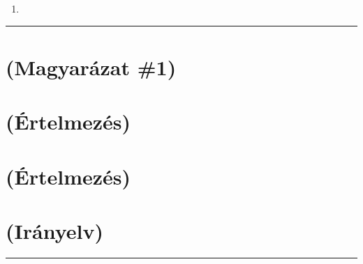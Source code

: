\documentclass[]{report}
\newenvironment{expl}[0]%
  {\rule{\textwidth}{.2pt}\footnotesize}%
  {\rule{\textwidth}{.2pt}\normalsize}
\begin{document}
\begin{enumerate}
\begin{enumerate}
\begin{enumerate}
            \begin{enumerate}
            \item
            
            \item
            
            \item
            
            \end{enumerate}
        \end{enumerate}
    \item
    
        \begin{enumerate}
        \item
        
        \item
        
        \end{enumerate}
    \item
    
        \begin{enumerate}
        \item
        
        \item
        
        \end{enumerate}
    \item
    
    \item
    
        \begin{enumerate}
        \item
        
        \item
        
        \end{enumerate}
    \end{enumerate}
\item

\end{enumerate}

\begin{expl}
\section*{(Magyarázat \#1)}

\section*{(Értelmezés)}

\section*{(Értelmezés)}

\section*{(Irányelv)}

\end{expl}
\end{document}
